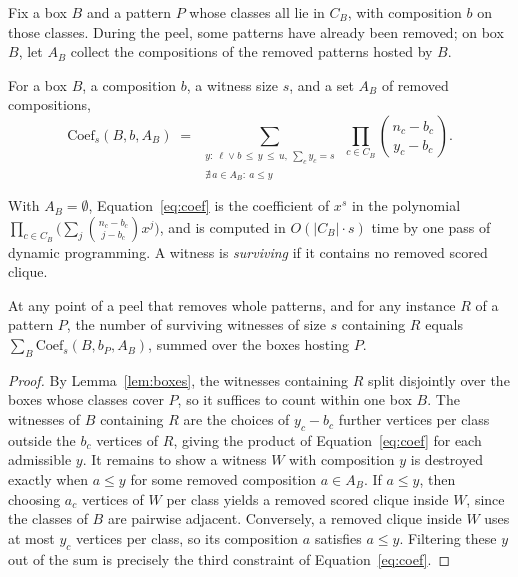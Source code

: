 Fix a box $B$ and a pattern $P$ whose classes all lie in $C_B$, with composition $b$ on those classes.
%
During the peel, some patterns have already been removed; on box $B$, let $A_B$ collect the compositions of the removed patterns hosted by $B$.

\begin{definition}\label{def:coef}
For a box $B$, a composition $b$, a witness size $s$, and a set $A_B$ of removed compositions,
\begin{equation}\label{eq:coef}
\mathrm{Coef}_s(B,b,A_B)\;=\;
\sum_{\substack{y:\ \ell\vee b\,\le\, y\,\le\, u,\ \sum_c y_c=s\\ \nexists\, a\in A_B:\ a\le y}}
\ \prod_{c\in C_B}\binom{n_c-b_c}{\,y_c-b_c\,}.
\end{equation}
\end{definition}

With $A_B=\emptyset$, Equation~\eqref{eq:coef} is the coefficient of $x^{s}$ in the polynomial $\prod_{c\in C_B}\bigl(\sum_{j}\binom{n_c-b_c}{j-b_c}x^{j}\bigr)$, and is computed in $O(|C_B|\cdot s)$ time by one pass of dynamic programming.
%
A witness is \emph{surviving} if it contains no removed scored clique.

\begin{lemma}\label{lem:residual}
At any point of a peel that removes whole patterns, and for any instance $R$ of a pattern $P$,
the number of surviving witnesses of size $s$ containing $R$ equals
$\sum_{B}\mathrm{Coef}_s(B,b_P,A_B)$, summed over the boxes hosting $P$.
\end{lemma}

\begin{proof}
By Lemma~\ref{lem:boxes}, the witnesses containing $R$ split disjointly over the boxes whose classes cover $P$, so it suffices to count within one box $B$.
%
The witnesses of $B$ containing $R$ are the choices of $y_c-b_c$ further vertices per class outside the $b_c$ vertices of $R$, giving the product of Equation~\eqref{eq:coef} for each admissible $y$.
%
It remains to show a witness $W$ with composition $y$ is destroyed exactly when $a\le y$ for some removed composition $a\in A_B$.
%
If $a\le y$, then choosing $a_c$ vertices of $W$ per class yields a removed scored clique inside $W$, since the classes of $B$ are pairwise adjacent.
%
Conversely, a removed clique inside $W$ uses at most $y_c$ vertices per class, so its composition $a$ satisfies $a\le y$.
%
Filtering these $y$ out of the sum is precisely the third constraint of Equation~\eqref{eq:coef}.
\end{proof}

